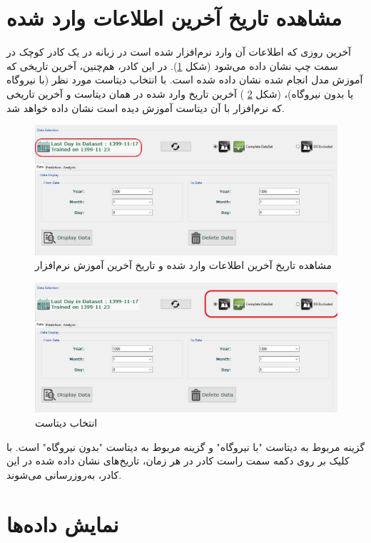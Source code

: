\documentclass[a4paper,20pt,dvipsnames, usenames]{extbook}
\begin{document}
\section{مشاهده تاریخ آخرین اطلاعات وارد شده}
آخرین روزی که اطلاعات آن وارد نرم‌افزار شده است در زبانه
در یک کادر کوچک در سمت چپ نشان داده می‌شود (شکل 
\ref{fig0}).
در این کادر، هم‌چنین، آخرین تاریخی که آموزش مدل انجام شده نشان داده شده است. با انتخاب دیتاست مورد نظر (با نیروگاه یا بدون نیروگاه)، (شکل
\ref{fig0-1}
) آخرین تاریخ وارد شده در همان دیتاست و آخرین تاریخی که نرم‌افزار با آن دیتاست آموزش دیده است نشان داده خواهد شد. 
\begin{figure}[!h]
	\centering
	\includegraphics[width = \textwidth]{fig0}
	\caption{مشاهده تاریخ آخرین اطلاعات وارد شده و تاریخ آخرین آموزش نرم‌افزار}
	\label{fig0}
\end{figure}
\begin{figure}[!h]
	\centering
	\includegraphics[width = \textwidth]{fig1}
	\caption{انتخاب دیتاست}
	\label{fig0-1}
\end{figure}

گزینه
مربوط به دیتاست "با نیروگاه" و گزینه 
مربوط به دیتاست "بدون نیروگاه" است.
با کلیک بر روی دکمه سمت راست کادر در هر زمان، تاریخ‌های نشان داده شده در این کادر، ‌به‌روز‌رسانی می‌شوند.



\section{نمایش داده‌ها}
\end{document}
